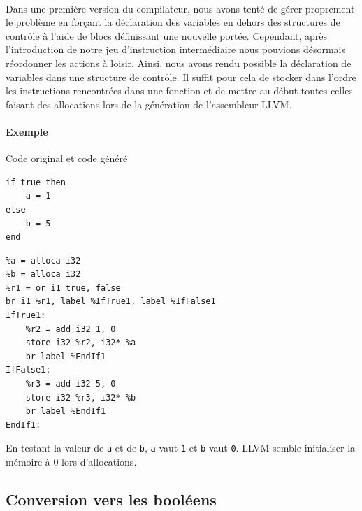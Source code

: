 \documentclass[12pt]{article}
\begin{document}
\paragraph{} Dans une première version du compilateur, nous avons tenté de gérer proprement le problème en forçant la déclaration des variables en dehors des structures de contrôle à l'aide de blocs définissant une nouvelle portée. Cependant, après l'introduction de notre jeu d'instruction intermédiaire nous pouvions désormais réordonner les actions à loisir. Ainsi, nous avons rendu possible la déclaration de variables dans une structure de contrôle. Il suffit pour cela de stocker dans l'ordre les instructions rencontrées dans une fonction et de mettre au début toutes celles faisant des allocations lors de la génération de l'assembleur LLVM.

\paragraph{Exemple} Code original et code généré

\vspace{0.5cm}

\begin{minipage}{0.48\textwidth}
\begin{verbatim}
if true then
    a = 1
else
    b = 5
end
\end{verbatim}
\end{minipage}
\begin{minipage}{0.48\textwidth}
\begin{verbatim}
%a = alloca i32
%b = alloca i32
%r1 = or i1 true, false
br i1 %r1, label %IfTrue1, label %IfFalse1
IfTrue1:
    %r2 = add i32 1, 0
    store i32 %r2, i32* %a
    br label %EndIf1
IfFalse1:
    %r3 = add i32 5, 0
    store i32 %r3, i32* %b
    br label %EndIf1
EndIf1:
\end{verbatim}
\end{minipage}

\vspace{0.5cm}

En testant la valeur de \verb!a! et de \verb!b!, \verb!a! vaut \verb!1! et \verb!b! vaut \verb!0!. LLVM semble initialiser la mémoire à 0 lors d'allocations.

\subsection{Conversion vers les booléens}
\end{document}
